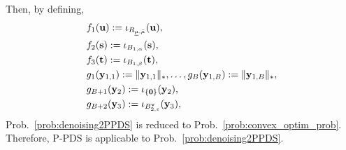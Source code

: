 \documentclass[10pt,journal]{IEEEtran}
\begin{document}
Then, by defining,
\begin{align}
    \label{eq:FuncMapping}
    & f_{1} (\mathbf{u}) := \iota_{R_{\underline{\mu},\bar{\mu}}} (\mathbf{u}), \nonumber \\
    & f_{2} (\mathbf{s}) := \iota_{B_{1, \alpha}} (\mathbf{s}), \nonumber \\
    & f_{3} (\mathbf{t}) := \iota_{B_{1, \beta}} (\mathbf{t}), \nonumber \\
    & g_{1} (\mathbf{y}_{1, 1}) := \| \mathbf{y}_{1, 1} \|_{*}, \ldots, g_{B}(\mathbf{y}_{1, B}) := \| \mathbf{y}_{1, B} \|_{*}, \nonumber \\
    & g_{B + 1} (\mathbf{y}_{2}) := \iota_{\{ \mathbf{0} \}} (\mathbf{y}_{2}), \nonumber \\
    & g_{B + 2} (\mathbf{y}_{3}) := \iota_{B_{2, \varepsilon}^{\mathbf{v}}} (\mathbf{y}_{3}),
\end{align}
Prob.~\eqref{prob:denoising2PPDS} is reduced to Prob.~\eqref{prob:convex_optim_prob}.
Therefore, P-PDS is applicable to Prob.~\eqref{prob:denoising2PPDS}.
% 


\end{document}
